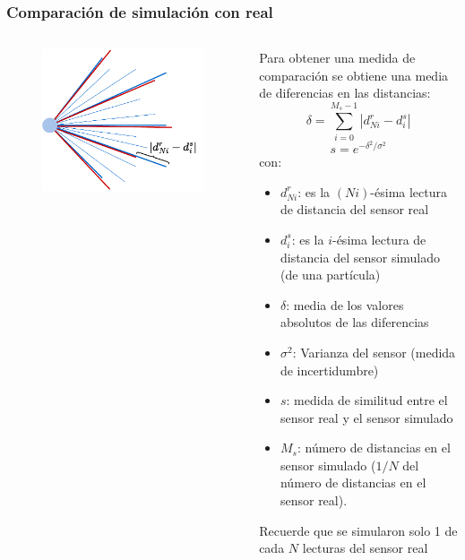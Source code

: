 \begin{frame}\frametitle{Comparación de simulación con real}
  \begin{columns}
    \begin{column}{0.4\textwidth}
      \begin{figure}
        \centering
        \includegraphics[width=\textwidth]{Figures/MotionPlanning/ParticleFilterLaserComparison.pdf}
      \end{figure}
    \end{column}
    \begin{column}{0.6\textwidth}
      Para obtener una medida de comparación se obtiene una media de diferencias en las distancias:
      \[\delta = \sum_{i=0}^{M_s - 1}\left|d^r_{Ni} - d^s_i\right|\]
      \[s = e^{-\delta^2/\sigma^2}\]
      con:
      \begin{itemize}
      \item $d^r_{Ni}$: es la $(Ni)$-ésima lectura de distancia del sensor real
      \item $d^s_i$: es la $i$-ésima lectura de distancia del sensor simulado (de una partícula)
      \item $\delta$: media de los valores absolutos de las diferencias
      \item $\sigma^2$: Varianza del sensor (medida de incertidumbre)
      \item $s$: medida de similitud entre el sensor real y el sensor simulado
      \item $M_s$: número de distancias en el sensor simulado ($1/N$ del número de distancias en el sensor real). 
      \end{itemize}
      Recuerde que se simularon solo 1 de cada $N$ lecturas del sensor real
    \end{column}
  \end{columns}
\end{frame}

